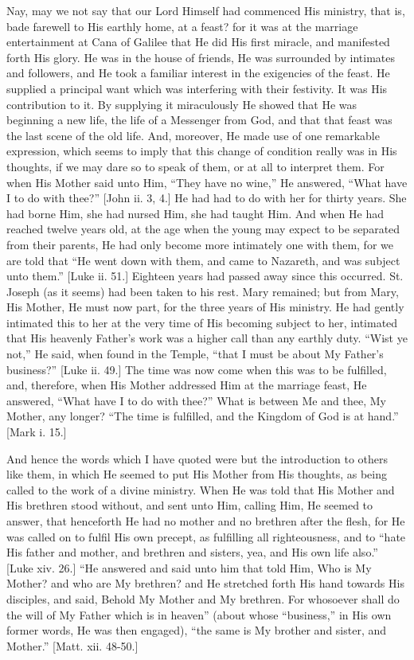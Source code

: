 Nay, may we not say that our Lord Himself had commenced His
ministry, that is, bade farewell to His earthly home, at a feast? for
it was at the marriage entertainment at Cana of Galilee that He did
His first miracle, and manifested forth His glory. He was in the house
of friends, He was surrounded by intimates and followers, and He took
a familiar interest in the exigencies of the feast. He supplied a
principal want which was interfering with their festivity. It was His
contribution to it. By supplying it miraculously He showed that He was
beginning a new life, the life of a Messenger from God, and that that
feast was the last scene of the old life. And, moreover, He made use
of one remarkable expression, which seems to imply that this change of
condition really was in His thoughts, if we may dare so to speak of
them, or at all to interpret them. For when His Mother said unto Him,
``They have no wine,'' He answered, ``What have I to do
with thee?'' [John ii. 3, 4.] He had had to do with her for thirty
years. She had borne Him, she had nursed Him, she had taught Him. And
when He had reached twelve years old, at the age when the young may
expect to be separated from their parents, He had only become more
intimately one with them, for we are told that ``He went down with
them, and came to Nazareth, and was subject unto them.'' [Luke ii.
51.] Eighteen years had passed away since this occurred. St. Joseph
(as it seems) had been taken to his rest. Mary remained; but from
Mary, His Mother, He must now part, for the three years of His
ministry. He had gently intimated this to her at the very time of His
becoming subject to her, intimated that His heavenly Father's work was
a higher call than any earthly duty. ``Wist ye not,'' He said,
when found in the Temple, ``that I must be about My Father's
business?'' [Luke ii. 49.] The time was now come when this was to
be fulfilled, and, therefore, when His Mother addressed Him at the
marriage feast, He answered, ``What have I to do with thee?''
What is between Me and thee, My Mother, any longer? ``The time is
fulfilled, and the Kingdom of God is at hand.'' [Mark i. 15.]

And hence the words which I have quoted were but the introduction
to others like them, in which He seemed to put His Mother from His
thoughts, as being called to the work of a divine ministry. When He
was told that His Mother and His brethren stood without, and sent unto
Him, calling Him, He seemed to answer, that henceforth He had no
mother and no brethren after the flesh, for He was called on to fulfil
His own precept, as fulfilling all righteousness, and to ``hate
His father and mother, and brethren and sisters, yea, and His own life
also.'' [Luke xiv. 26.] ``He answered and said unto him that
told Him, Who is My Mother? and who are My brethren? and He stretched
forth His hand towards His disciples, and said, Behold My Mother and
My brethren. For whosoever shall do the will of My Father which is in
heaven'' (about whose ``business,'' in His own former
words, He was then engaged), ``the same is My brother and sister,
and Mother.'' [Matt. xii. 48-50.]

